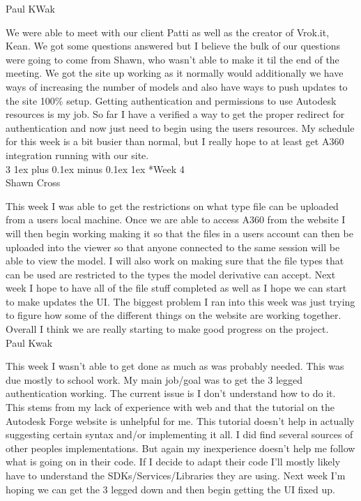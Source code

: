 \documentclass[letterpaper, 10pt, draftclsnofoot, compsoc, onecolumn]{IEEEtran}
\makeatletter
\def\subsubsection{\@startsection{subsubsection}%
                                 {3}%
                                 {\z@}%
                                 {1ex plus 0.1ex minus 0.1ex}%
                                 {1ex}%
                                 {\normalfont\normalsize}}%
\makeatother
\begin{document}
Paul KWak

We were able to meet with our client Patti as well as the creator of Vrok.it, Kean. We got some questions answered but I believe the bulk of our questions were going to come from Shawn, who wasn't able to make it til the end of the meeting. We got the site up working as it normally would additionally we have ways of increasing the number of models and also have ways to push updates to the site 100\% setup. Getting authentication and permissions to use Autodesk resources is my job. So far I have a verified a way to get the proper redirect for authentication and now just need to begin using the users resources. My schedule for this week is a bit busier than normal, but I really hope to at least get A360 integration running with our site.\\
\subsubsection*{Week 4}\hspace*{\fill} \\
Shawn Cross

This week I was able to get the restrictions on what type file can be uploaded from a users local machine. Once we are able to access A360 from the website I will then begin working making it so that the files in a users account can then be uploaded into the viewer so that anyone connected to the same session will be able to view the model. I will also work on making sure that the file types that can be used are restricted to the types the model derivative can accept. Next week I hope to have all of the file stuff completed as well as I hope we can start to make updates the UI. The biggest problem I ran into this week was just trying to figure how some of the different things on the website are working together. Overall I think we are really starting to make good progress on the project.\\

Paul Kwak

This week I wasn't able to get done as much as was probably needed. This was due mostly to school work. My main job/goal was to get the 3 legged authentication working. The current issue is I don't understand how to do it. This stems from my lack of experience with web and that the tutorial on the Autodesk Forge website is unhelpful for me. This tutorial doesn't help in actually suggesting certain syntax and/or implementing it all. I did find several sources of other peoples implementations. But again my inexperience doesn't help me follow what is going on in their code. If I decide to adapt their code I'll mostly likely have to understand the SDKs/Services/Libraries they are using. Next week I'm hoping we can get the 3 legged down and then begin getting the UI fixed up.\\
\end{document}
